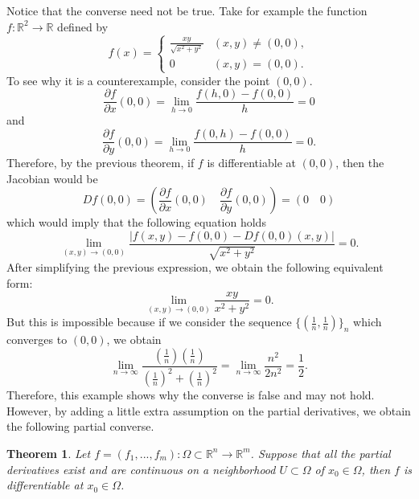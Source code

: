 \documentclass{article}
\theoremstyle{plain}
\newtheorem{theorem}{Theorem}[subsection]
\theoremstyle{definition}
\newcommand{\R}{\mathbb{R}}
\begin{document}
Notice that the converse need not be true. Take for example the function $f: \R^2 \to \R$ defined by 
$$f(x) = \begin{cases}
    \frac{xy}{\sqrt{x^2 + y^2}} & (x,y) \neq (0,0), \\
    0 & (x,y) = (0,0).
\end{cases}$$
To see why it is a counterexample, consider the point $(0,0)$.
$$\frac{\partial f}{\partial x}(0,0) = \lim_{h \rightarrow 0}\frac{f(h,0) - f(0,0)}{h} = 0$$
and 
$$\frac{\partial f}{\partial y}(0,0) = \lim_{h \rightarrow 0}\frac{f(0,h) - f(0,0)}{h} = 0.$$
Therefore, by the previous theorem, if $f$ is differentiable at $(0,0)$, then the Jacobian would be
$$Df(0,0) = \left(\frac{\partial f}{\partial x}(0,0) \quad \frac{\partial f}{\partial y}(0,0)\right) = (0 \quad 0)$$
which would imply that the following equation holds
$$\lim_{(x,y) \to (0,0)}\frac{|f(x,y) - f(0,0) - Df(0,0)(x,y)|}{\sqrt{x^2 + y^2}} = 0.$$
After simplifying the previous expression, we obtain the following equivalent form:
$$\lim_{(x,y) \rightarrow (0,0)}\frac{xy}{x^2 + y^2} = 0.$$
But this is impossible because if we consider the sequence $\{(\frac{1}{n}, \frac{1}{n})\}_n$ which converges to $(0,0)$, we obtain
$$\lim_{n \rightarrow \infty}\frac{\left(\frac{1}{n}\right)\left(\frac{1}{n}\right)}{\left(\frac{1}{n}\right)^2 + \left(\frac{1}{n}\right)^2} = \lim_{n \rightarrow \infty}\frac{n^2}{2n^2} = \frac{1}{2}.$$
Therefore, this example shows why the converse is false and may not hold. However, by adding a little extra assumption on the partial derivatives, we obtain the following partial converse.

\begin{theorem}
    Let $f = (f_1, ..., f_m) : \Omega \subset \R^n \to \R^m$. Suppose that all the partial derivatives exist and are continuous on a neighborhood $U \subset \Omega$ of $x_0 \in \Omega$, then $f$ is differentiable at $x_0 \in \Omega$.
\end{theorem}
\end{document}

